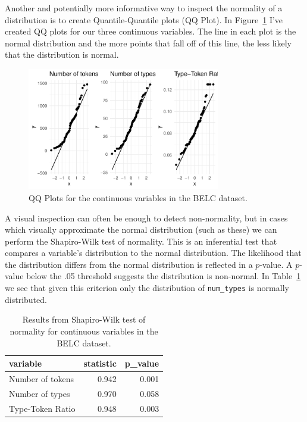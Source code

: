 \documentclass[
  letterpaper,
]{latex/krantz}
\begin{document}
Another and potentially more informative way to inspect the normality of
a distribution is to create Quantile-Quantile plots (QQ Plot). In
Figure~\ref{fig-summaries-qqnorm-plot-belc} I've created QQ plots for
our three continuous variables. The line in each plot is the normal
distribution and the more points that fall off of this line, the less
likely that the distribution is normal.

\begin{figure}[h]

{\centering \includegraphics[width=0.75\textwidth,height=\textheight]{approaching-analysis_files/figure-pdf/fig-summaries-qqnorm-plot-belc-1.pdf}

}

\caption{\label{fig-summaries-qqnorm-plot-belc}QQ Plots for the
continuous variables in the BELC dataset.}

\end{figure}

A visual inspection can often be enough to detect non-normality, but in
cases which visually approximate the normal distribution (such as these)
we can perform the Shapiro-Wilk test of normality. This is an
inferential test that compares a variable's distribution to the normal
distribution. The likelihood that the distribution differs from the
normal distribution is reflected in a \(p\)-value. A \(p\)-value below
the .05 threshold suggests the distribution is non-normal. In
Table~\ref{tbl-summaries-normality-test-belc} we see that given this
criterion only the distribution of \texttt{num\_types} is normally
distributed.

\hypertarget{tbl-summaries-normality-test-belc}{}
\begin{table}
\caption{\label{tbl-summaries-normality-test-belc}Results from Shapiro-Wilk test of normality for continuous variables in
the BELC dataset. }\tabularnewline

\centering
\begin{tabular}{lrr}
\toprule
variable & statistic & p\_value\\
\midrule
Number of tokens & 0.942 & 0.001\\
Number of types & 0.970 & 0.058\\
Type-Token Ratio & 0.948 & 0.003\\
\bottomrule
\end{tabular}
\end{table}
\end{document}
